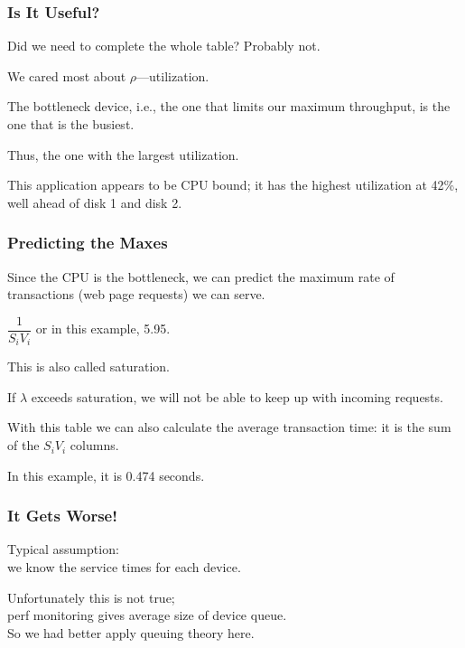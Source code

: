 \begin{frame}
\frametitle{Is It Useful?}

\begin{changemargin}{1cm}
\large 
Did we need to complete the whole table? Probably not. 

We cared most about $\rho$---utilization. 

The bottleneck device, i.e., the one that limits our maximum throughput, is the one that is the busiest. 

Thus, the one with the largest utilization. 

This application appears to be CPU bound; it has the highest utilization at 42\%, well ahead of disk 1 and disk 2. 
\end{changemargin}

\end{frame}



\begin{frame}
\frametitle{Predicting the Maxes}

\begin{changemargin}{1cm}
\large 
Since the CPU is the bottleneck, we can predict the maximum rate of transactions (web page requests) we can serve. 

\hspace*{10em} $\dfrac{1}{S_{i}V_{i}}$ or in this example, 5.95. 

This is also called saturation.

 If $\lambda$ exceeds saturation, we will not be able to keep up with incoming requests.

With this table we can also calculate the average transaction time: it is the sum of the $S_{i}V_{i}$ columns. 

In this example, it is 0.474 seconds. 
\end{changemargin}

\end{frame}



\begin{frame}
\frametitle{It Gets Worse!}

\begin{changemargin}{0.8cm}
\large 
Typical assumption: \\
\qquad we know the service times for each device. 

Unfortunately this is not true;\\
\qquad perf monitoring gives average size of device queue. \\[1em]

So we had better apply queuing theory here.
\end{changemargin}


\end{frame}



